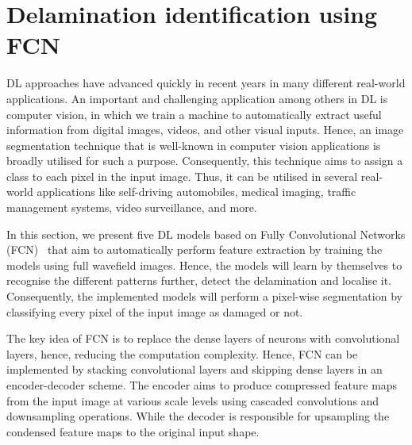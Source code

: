 \section{Delamination identification using FCN}
\label{sec43}
DL approaches have advanced quickly in recent years in many different real-world applications.
An important and challenging application among others in DL is computer vision, in which we train a machine to automatically extract useful information from digital images, videos, and other visual inputs.
Hence, an image segmentation technique that is well-known in computer vision applications is broadly utilised for such a purpose.
Consequently, this technique aims to assign a class to each pixel in the input image.
Thus, it can be utilised in several real-world applications like self-driving automobiles, medical imaging, traffic management systems, video surveillance, and more.

In this section, we present five DL models based on Fully Convolutional Networks (FCN)~\cite{Shelhamer2017a} that aim to automatically perform feature extraction by training the models using full wavefield images. 
Hence, the models will learn by themselves to recognise the different patterns further, detect the delamination and localise it.
Consequently, the implemented models will perform a pixel-wise segmentation by classifying every pixel of the input image as damaged or not.

The key idea of FCN is to replace the dense layers of neurons with convolutional layers, hence, reducing the computation complexity.
Hence, FCN can be implemented by stacking convolutional layers and skipping dense layers in an encoder-decoder scheme.
The encoder aims to produce compressed feature maps from the input image at various scale levels using cascaded convolutions and downsampling operations.
While the decoder is responsible for upsampling the condensed feature maps to the original input shape.



